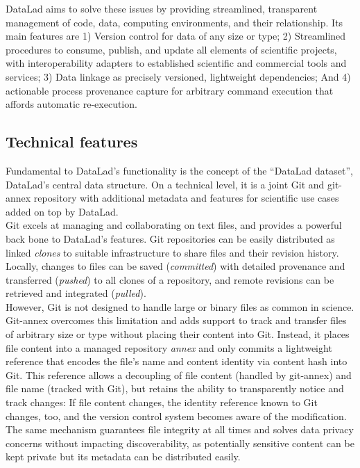 {DataLad aims to solve these issues by providing streamlined, transparent management of code, data, computing environments, and their relationship.
Its main features are 1) Version control for data of any size or type; 2) Streamlined procedures to consume, publish, and update  all elements of scientific projects, with interoperability adapters to established scientific and commercial tools and services; 3) Data linkage as precisely versioned, lightweight dependencies; And 4) actionable process provenance capture for arbitrary command execution that affords automatic re-execution.

\subsection{Technical features}

Fundamental to DataLad's functionality is the concept of the ``DataLad dataset'', DataLad's central data structure.
On a technical level, it is a joint Git and git-annex repository with additional metadata and features for scientific use cases added on top by DataLad.\\
Git excels at managing and collaborating on text files, and provides a powerful back bone to DataLad's features.
Git repositories can be easily distributed as linked \textit{clones} to suitable infrastructure to share files and their revision history.
Locally, changes to files can be saved (\textit{committed}) with detailed provenance and transferred (\textit{pushed}) to all clones of a repository, and remote revisions can be retrieved and integrated (\textit{pulled}).\\
However, Git is not designed to handle large or binary files as common in science.
Git-annex overcomes this limitation and adds support to track and transfer files of arbitrary size or type without placing their content into Git.
Instead, it places file content into a managed repository \textit{annex} and only commits a lightweight reference that encodes the file's name and content identity via content hash into Git.
This reference allows a decoupling of file content (handled by git-annex) and file name (tracked with Git), but retains the ability to transparently notice and track changes: If file content changes, the identity reference known to Git changes, too, and the version control system becomes aware of the modification.
The same mechanism guarantees file integrity at all times and solves data privacy concerns without impacting discoverability, as potentially sensitive content can be kept private but its metadata can be distributed easily.
}
